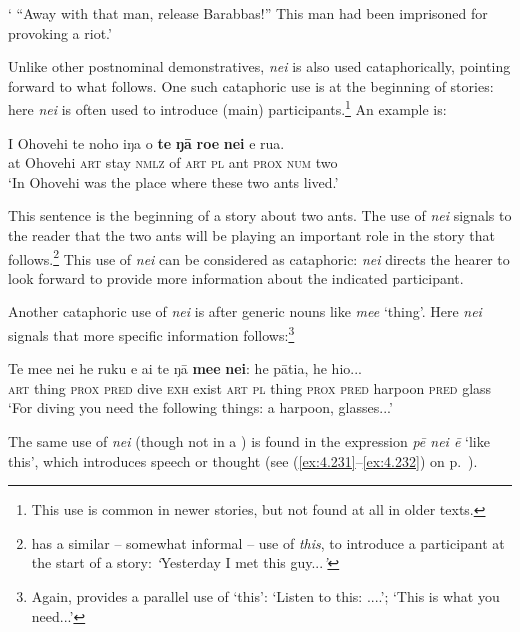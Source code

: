 \glt
‘ “Away with that man, release Barabbas!” This man had been imprisoned for provoking a riot.’ \textstyleExampleref{[Luke 23:19]}
\z

Unlike other postnominal demonstratives, \textit{nei} is also used cataphorically, pointing forward to what follows. One such cataphoric use is at the beginning of stories: here \textit{nei} is often used to introduce (main) participants.\footnote{\label{fn:220}This use is common in newer stories, but not found at all in older texts.} An example is:

\ea\label{ex:4.210}
\gll {\ꞌ}I {\ꞌ}Ohovehi te noho iŋa o \textbf{te} \textbf{ŋā} \textbf{roe} \textbf{nei} e rua. \\
at Ohovehi \textsc{art} stay \textsc{nmlz} of \textsc{art} \textsc{pl} ant \textsc{prox} \textsc{num} two \\

\glt
‘In Ohovehi was the place where these two ants lived.’ \textstyleExampleref{[R214.001]} 
\z

This sentence is the beginning of a story about two ants. The use of \textit{nei} signals to the reader that the two ants will be playing an important role in the story that follows.\footnote{\label{fn:221} has a similar – somewhat informal – use of \textit{this}, to introduce a participant at the start of a story: \textit{‘}Yesterday I met this guy...\textit{’}} This use of \textit{nei} can be considered as cataphoric: \textit{nei} directs the hearer to look forward to provide more information about the indicated participant. 

Another cataphoric use of \textit{nei} is after generic nouns like \textit{me{\ꞌ}e} ‘thing’. Here \textit{nei} signals that more specific information follows:\footnote{\label{fn:222}Again,  provides a parallel use of ‘this’: ‘Listen to this: ....’; ‘This is what you need...’} 

\ea\label{ex:4.211}
\gll Te me{\ꞌ}e nei he ruku e ai te ŋā \textbf{me{\ꞌ}e} \textbf{nei}: he pātia, he hi{\ꞌ}o... \\
\textsc{art} thing \textsc{prox} \textsc{pred} dive \textsc{exh} exist \textsc{art} \textsc{pl} thing \textsc{prox} \textsc{pred} harpoon \textsc{pred} glass \\

\glt
‘For diving you need the following things: a harpoon, glasses...’ \textstyleExampleref{[R360.001]} 
\z

The same use of \textit{nei} (though not in a ) is found in the expression \textit{pē nei ē} ‘like this’, which introduces speech or thought (see (\ref{ex:4.231}–\ref{ex:4.232}) on p.~\pageref{ex:4.231}).

